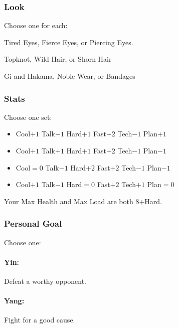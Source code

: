 \subsubsection{Look}

Choose one for each:

Tired Eyes, Fierce Eyes, or Piercing Eyes.

Topknot, Wild Hair, or Shorn Hair

Gi and Hakama, Noble Wear, or Bandages

\subsubsection{Stats}
Choose one set:
\begin{itemize}
\setlength\itemsep{0em}
\item Cool$+1$ Talk$-1$ Hard$+1$ Fast$+2$ Tech$-1$ Plan$+1$
\item Cool$+1$ Talk$+1$ Hard$+1$ Fast$+2$ Tech$-1$ Plan$-1$
\item Cool${=}0$ Talk$-1$ Hard$+2$ Fast$+2$ Tech$-1$ Plan$-1$
\item Cool$+1$ Talk$-1$ Hard${=}0$ Fast$+2$ Tech$+1$ Plan${=}0$
\end{itemize}

Your Max Health and Max Load are both 8+Hard.

\subsubsection{Personal Goal}
Choose one:
\paragraph{Yin:} Defeat a worthy opponent.
\paragraph{Yang:} Fight for a good cause.

